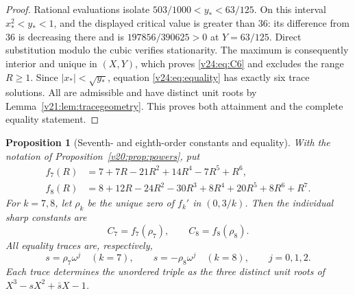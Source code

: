 \documentclass[UTF8,11pt]{ctexart}
\newtheorem{prop}[thm]{Proposition}
\theoremstyle{definition}
\numberwithin{equation}{section}
\begin{document}
\begin{proof}
Rational evaluations isolate $503/1000<y_*<63/125$.
On this interval $x_*^2<y_*<1$, and the displayed critical
value is greater than $36$: its difference from $36$ is
decreasing there and is $197856/390625>0$ at $Y=63/125$.
Direct substitution modulo the cubic verifies stationarity.
The maximum is consequently interior and unique in $(X,Y)$,
which proves \eqref{v24:eq:C6} and excludes the range $R\ge1$.
Since $|x_*|<\sqrt{y_*}$, equation \eqref{v24:eq:equality}
has exactly six trace solutions. All are admissible and have
distinct unit roots by Lemma~\ref{v21:lem:tracegeometry}.
This proves both attainment and the complete equality statement.
\end{proof}


\begin{prop}[Seventh- and eighth-order constants and equality]
\label{v26:prop:power78}
With the notation of Proposition~\ref{v20:prop:powers}, put
\begin{align*}
 f_7(R)&=7+7R-21R^2+14R^4-7R^5+R^6,\\
 f_8(R)&=8+12R-24R^2-30R^3+8R^4+20R^5+8R^6+R^7.
\end{align*}
For $k=7,8$, let $\rho_k$ be the unique zero of $f_k'$ in
$(0,3/k)$. Then the individual sharp constants are
\begin{equation}\label{v26:eq:constants}
                         C_7=f_7(\rho_7),\qquad C_8=f_8(\rho_8).
\end{equation}
All equality traces are, respectively,
\begin{equation}\label{v26:eq:equality}
 s=\rho_7\omega^j\quad(k=7),\qquad
 s=-\rho_8\omega^j\quad(k=8),\qquad j=0,1,2.
\end{equation}
Each trace determines the unordered triple as the three distinct
unit roots of $X^3-sX^2+\bar sX-1$.
\end{prop}
\end{document}
